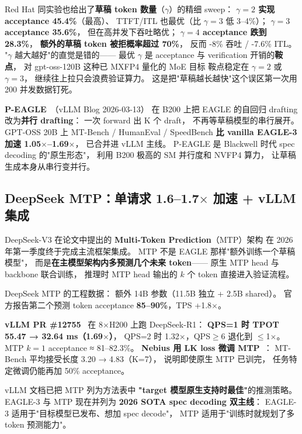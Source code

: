 Red Hat 同实验也给出了\textbf{草稿 token 数量}（$\gamma$）的精细 sweep：
\textbf{$\gamma=2$ 实现 acceptance 45.4\%}（最高）、
TTFT/ITL 也最优（比 $\gamma=3$ 低 3--4\%）；
\textbf{$\gamma=3$ acceptance 35.6\%}，
但在高并发下吞吐略优；
\textbf{$\gamma=4$ acceptance 跌到 28.3\%}，
\textbf{额外的草稿 token 被拒概率超过 70\%}，
反而 -8\% 吞吐 / -7.6\% ITL。
"$\gamma$ 越大越好"的直觉是错的——
最优 $\gamma$ 是 acceptance 与 verification 开销的\textbf{鞍点}，
对 gpt-oss-120B 这种已 MXFP4 量化的 MoE 目标
鞍点稳定在 $\gamma=2$ 或 $\gamma=3$，
继续往上拉只会浪费验证算力。
这是把"草稿越长越快"这个误区第一次用 200 并发数据钉死。

\textbf{P-EAGLE}~\cite{peagle2026}（vLLM Blog 2026-03-13）
在 B200 上把 EAGLE 的自回归 drafting 改为\textbf{并行 drafting}：
一次 forward 出 K 个 draft，
不再等草稿模型的串行展开。
GPT-OSS 20B 上 MT-Bench / HumanEval / SpeedBench
\textbf{比 vanilla EAGLE-3 加速 1.05$\times$--1.69$\times$}，
已合并进 vLLM 主线。
P-EAGLE 是 Blackwell 时代 spec decoding 的"原生形态"，
利用 B200 极高的 SM 并行度和 NVFP4 算力，
让草稿生成本身从串行变并行。

\subsection{DeepSeek MTP：单请求 1.6--1.7$\times$ 加速 + vLLM 集成}
\label{sec:deepseek-mtp}

DeepSeek-V3 在论文中提出的
\textbf{Multi-Token Prediction}（MTP）架构
在 2026 年第一季度终于完成主流框架集成。
MTP 不是 EAGLE 那样"额外训练一个草稿模型"，
而是\textbf{在主模型架构内多预测几个未来 token}——
原生 MTP head 与 backbone 联合训练，
推理时 MTP head 输出的 $k$ 个 token 直接进入验证流程。

DeepSeek MTP 的工程数据：
额外 14B 参数（11.5B 独立 + 2.5B shared）。
官方报告第二个预测 token acceptance \textbf{85--90\%}，TPS +1.8$\times$。

\textbf{vLLM PR \#12755}~\cite{deepseekmtpvllm2026}
在 8$\times$H200 上跑 DeepSeek-R1：
\textbf{QPS=1 时 TPOT 55.47 → 32.64 ms（1.69$\times$）}，
QPS=2 时 1.32$\times$，QPS$\geq$6 退化到 $\leq$1$\times$。
MTP $k=1$ acceptance ≈ 81--82.3\%。
\textbf{Nebius 用 LK loss 微调 MTP}~\cite{nebiusmtp2026}：
MT-Bench 平均接受长度 3.20 → 4.83（K=7），
说明即使原生 MTP 已训完，
任务特定微调仍能再加 50\% acceptance。

vLLM 文档已把 MTP 列为方法表中
\textbf{"target 模型原生支持时最佳"}的推测策略。
EAGLE-3 与 MTP 现在并列为
\textbf{2026 SOTA spec decoding 双主线}：
EAGLE-3 适用于"目标模型已发布、想加 spec decode"，
MTP 适用于"训练时就规划了多 token 预测能力"。

